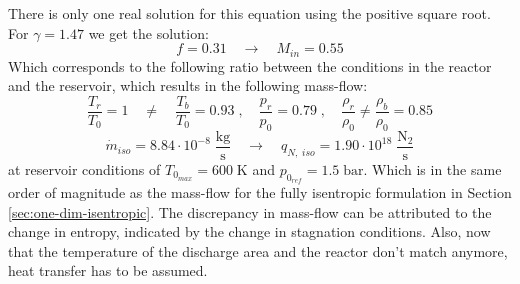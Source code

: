 	There is only one real solution for this equation using the positive square root.
	For $\gamma = 1.47$ we get the solution:
	$$
		f = 0.31
			\quad \to \quad
		M_{in} = 0.55
	$$
	Which corresponds to the following ratio between the conditions in the reactor and the reservoir, which results in the following mass-flow:
	$$
		\frac{T_r}{T_0} = 1 \quad \neq \quad \frac{T_b}{T_0} = 0.93\;,
			\quad
		\frac{p_r}{p_0} = 0.79\;,
			\quad
		\frac{\rho_r}{\rho_0} \neq \frac{\rho_b}{\rho_0} = 0.85
	$$
	$$
		\dot{m}_{iso} = 8.84 \cdot 10^{-8} \; \frac{\text{kg}}{\text{s}}
			\quad \rightarrow \quad
		q_{N,\;iso} = 1.90 \cdot 10^{18} \; \frac{\text{N}_2}{\text{s}}
	$$
	at reservoir conditions of $T_{0_{max}} = 600\;\text{K}$ and $p_{0_{ref}} = 1.5\;\text{bar}$.
	Which is in the same order of magnitude as the mass-flow for the fully isentropic formulation in Section \ref{sec:one-dim-isentropic}.
	The discrepancy in mass-flow can be attributed to the change in entropy, indicated by the change in stagnation conditions.
	Also, now that the temperature of the discharge area and the reactor don't match anymore, heat transfer has to be assumed.

